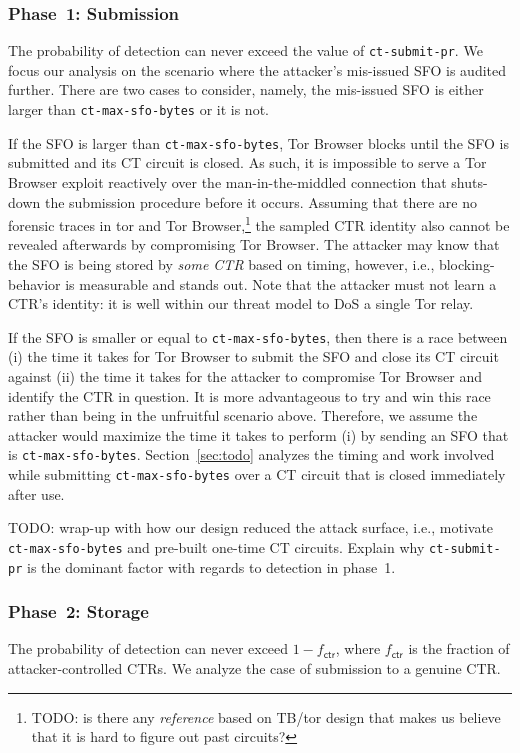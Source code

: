 \subsubsection{Phase~1: Submission} \label{sec:analysis:pr:phase1}
The probability of detection can never exceed the value of
\texttt{ct-submit-pr}.  We focus our analysis on the scenario where the
attacker's mis-issued SFO is audited further.  There are two cases to consider,
namely, the mis-issued SFO is either larger than \texttt{ct-max-sfo-bytes} or it
is not.

If the SFO is larger than \texttt{ct-max-sfo-bytes}, Tor Browser blocks until
the SFO is submitted and its CT circuit is closed.  As such, it is
impossible to serve a Tor Browser exploit reactively over the man-in-the-middled
connection that shuts-down the submission procedure before it occurs.  Assuming
that there are no forensic traces in tor and Tor Browser,\footnote{%
	TODO: is there any \emph{reference} based on TB/tor design that makes us
	believe that it is hard to figure out past circuits?
} the sampled CTR identity also cannot be revealed afterwards by compromising
Tor Browser.  The attacker may know that the SFO is being stored by \emph{some
CTR} based on timing, however, i.e., blocking-behavior is measurable and
stands out.  Note that the attacker must not learn a CTR's identity:
	it is well within our threat model to DoS a single Tor relay.

If the SFO is smaller or equal to \texttt{ct-max-sfo-bytes}, then there is a
race between (i) the time it takes for Tor Browser to submit the SFO and close
its CT circuit against (ii) the time it takes for the attacker to compromise Tor
Browser and identify the CTR in question.  It is more advantageous to try and
win this race rather than being in the unfruitful scenario above.  Therefore, we
assume the attacker would maximize the time it takes to perform (i) by sending
an SFO that is \texttt{ct-max-sfo-bytes}.  Section~\ref{sec:todo} analyzes the
timing and work involved while submitting \texttt{ct-max-sfo-bytes} over a CT
circuit that is closed immediately after use.

TODO: wrap-up with how our design reduced the attack surface, i.e., motivate
\texttt{ct-max-sfo-bytes} and pre-built one-time CT circuits.  Explain
why \texttt{ct-submit-pr} is the dominant factor with regards to detection in
phase~1.

\subsubsection{Phase~2: Storage} \label{sec:analysis:pr:phase2}
The probability of detection can never exceed $1-f_{\mathsf{ctr}}$, where
$f_{\mathsf{ctr}}$ is the fraction of attacker-controlled CTRs.  We analyze
the case of submission to a genuine CTR.

